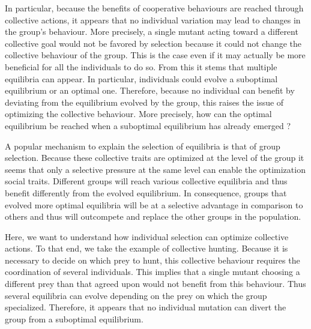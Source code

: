   In particular, because the benefits of cooperative behaviours are reached through collective actions, it appears that no individual variation may lead to changes in the group's behaviour. More precisely, a single mutant acting toward a different collective goal would not be favored by selection because it could not change the collective behaviour of the group. This is the case even if it may actually be more beneficial for all the individuals to do so. From this it stems that multiple equilibria can appear. In particular, individuals could evolve a suboptimal equilibrium or an optimal one. Therefore, because no individual can benefit by deviating from the equilibrium evolved by the group, this raises the issue of optimizing the collective behaviour. More precisely, how can the optimal equilibrium be reached when a suboptimal equilibrium has already emerged ?

  A popular mechanism to explain the selection of equilibria is that of group selection. Because these collective traits are optimized at the level of the group it seems that only a selective pressure at the same level can enable the optimization social traits. Different groups will reach various collective equilibria and thus benefit differently from the evolved equilibrium. In consequence, groups that evolved more optimal equilibria will be at a selective advantage in comparison to others and thus will outcompete and replace the other groups in the population.

  Here, we want to understand how individual selection can optimize collective actions. To that end, we take the example of collective hunting. Because it is necessary to decide on which prey to hunt, this collective behaviour requires the coordination of several individuals. This implies that a single mutant choosing a different prey than that agreed upon would not benefit from this behaviour. Thus several equilibria can evolve depending on the prey on which the group specialized. Therefore, it appears that no individual mutation can divert the group from a suboptimal equilibrium.

